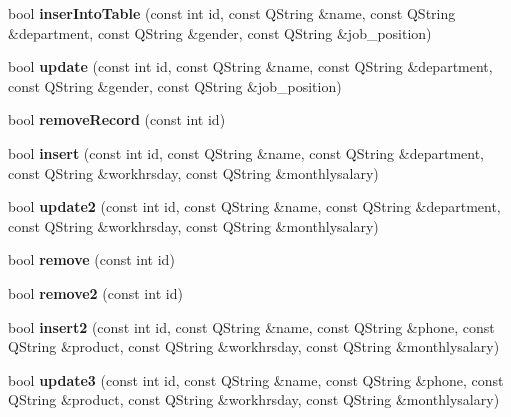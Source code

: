 \begin{DoxyCompactItemize}
\item 
\mbox{\label{class_data_base_af4874270775a567003c3e0295bd13da4}} 
bool {\bfseries inser\+Into\+Table} (const int id, const Q\+String \&name, const Q\+String \&department, const Q\+String \&gender, const Q\+String \&job\+\_\+position)
\item 
\mbox{\label{class_data_base_a383a66d485d39b99dffc81736b9ef99e}} 
bool {\bfseries update} (const int id, const Q\+String \&name, const Q\+String \&department, const Q\+String \&gender, const Q\+String \&job\+\_\+position)
\item 
\mbox{\label{class_data_base_a6ef1a8a1ce8133ac9d8e56366f5e1395}} 
bool {\bfseries remove\+Record} (const int id)
\item 
\mbox{\label{class_data_base_a7831da5caf873d7e4636f8131f5c397d}} 
bool {\bfseries insert} (const int id, const Q\+String \&name, const Q\+String \&department, const Q\+String \&workhrsday, const Q\+String \&monthlysalary)
\item 
\mbox{\label{class_data_base_a95b09aa60de1c4e0375a58c3cb718ef7}} 
bool {\bfseries update2} (const int id, const Q\+String \&name, const Q\+String \&department, const Q\+String \&workhrsday, const Q\+String \&monthlysalary)
\item 
\mbox{\label{class_data_base_a320efe9c042e576f0e59176603d945d9}} 
bool {\bfseries remove} (const int id)
\item 
\mbox{\label{class_data_base_a6102263338b25dcc1b49f53d02886c12}} 
bool {\bfseries remove2} (const int id)
\item 
\mbox{\label{class_data_base_a462cd3f510fe492783c4b9647f9dcffe}} 
bool {\bfseries insert2} (const int id, const Q\+String \&name, const Q\+String \&phone, const Q\+String \&product, const Q\+String \&workhrsday, const Q\+String \&monthlysalary)
\item 
\mbox{\label{class_data_base_af1ed979251180931a33d71d5681e1466}} 
bool {\bfseries update3} (const int id, const Q\+String \&name, const Q\+String \&phone, const Q\+String \&product, const Q\+String \&workhrsday, const Q\+String \&monthlysalary)
\end{DoxyCompactItemize}
